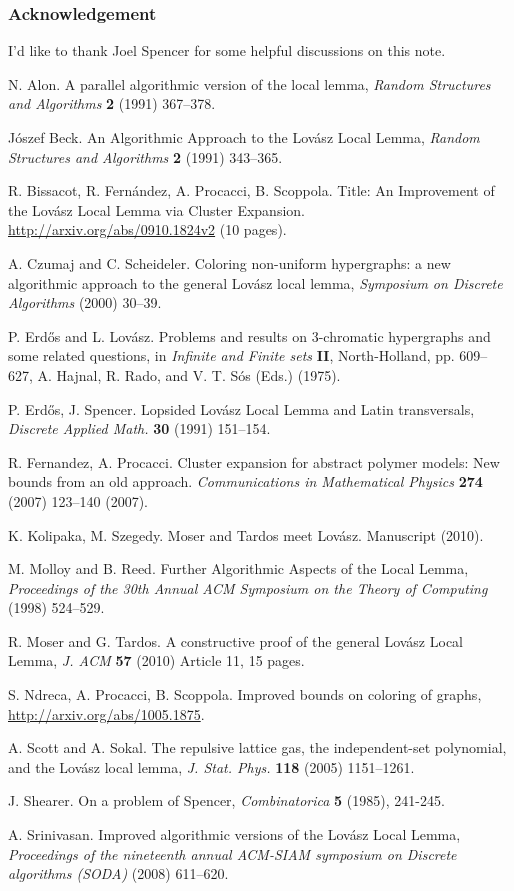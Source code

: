 \documentclass[letterpaper]{article}
\theoremstyle{definition}
\theoremstyle{remark}
\begin{document}
\subsubsection*{Acknowledgement}
I'd like to thank Joel Spencer for some helpful discussions on this note.



\begin{thebibliography}{10}


 N. Alon. A parallel algorithmic version of the local lemma, {\em Random Structures and Algorithms} {\bf 2} (1991) 367–378.


 J\'oszef Beck. An Algorithmic Approach to the Lov\'asz Local Lemma, \emph{Random Structures and Algorithms} {\bf 2} (1991) 343--365.

 R. Bissacot, R. Fern\'andez, A. Procacci, B. Scoppola.  Title: An Improvement of the Lovász Local Lemma via Cluster Expansion.  \url{http://arxiv.org/abs/0910.1824v2} (10 pages).

 A. Czumaj and C. Scheideler. Coloring non-uniform hypergraphs: a new algorithmic approach
to the general Lov\'asz local lemma, {\em Symposium on Discrete Algorithms} (2000) 30–39.


 P. Erd\H{o}s and L. Lov\'asz. Problems and results on 3-chromatic hypergraphs and some related questions, in {\em Infinite and Finite sets} {\bf II}, North-Holland, pp. 609–627, A. Hajnal, R. Rado, and V. T. S\'os (Eds.) (1975).

 P. Erd\H{o}s, J. Spencer. Lopsided Lov\'asz Local Lemma and Latin transversals, \emph{Discrete Applied Math.} {\bf 30} (1991) 151--154.

 R. Fernandez, A. Procacci. Cluster expansion for abstract polymer models: New bounds from an old
approach. {\em Communications in Mathematical Physics} {\bf 274} (2007) 123--140 (2007).

 K. Kolipaka, M. Szegedy.  Moser and Tardos meet Lov\'asz. Manuscript (2010).

 M. Molloy and B. Reed. Further Algorithmic Aspects of the Local Lemma, {\em Proceedings of the
30th Annual ACM Symposium on the Theory of Computing} (1998) 524–529.

 R. Moser and G. Tardos. A constructive proof of the general Lov\'asz Local Lemma, {\em J. ACM} {\bf 57} (2010) Article 11, 15 pages.

 S. Ndreca, A. Procacci, B. Scoppola.  Improved bounds on coloring of graphs, \url{http://arxiv.org/abs/1005.1875}.

 A. Scott and A. Sokal. The repulsive lattice gas, the independent-set polynomial, and the Lov\'asz local lemma, {\em J. Stat. Phys.} {\bf 118} (2005) 1151–1261.


 J. Shearer. On a problem of Spencer, {\em Combinatorica} {\bf 5} (1985), 241-245.

 A. Srinivasan. Improved algorithmic versions of the Lov\'asz Local Lemma, {\em Proceedings of the nineteenth annual ACM-SIAM symposium on Discrete algorithms (SODA)} (2008) 611–620.


\end{thebibliography}
\end{document}
